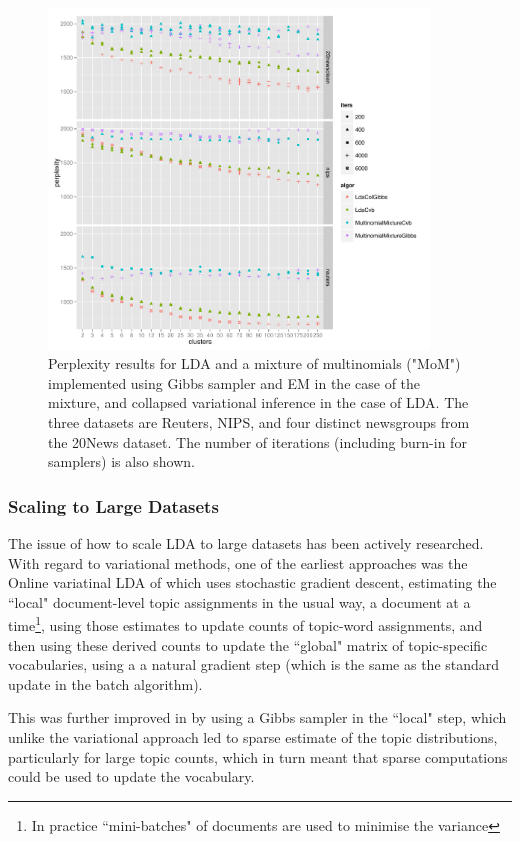 \begin{figure}
  \centering
    \includegraphics[width=0.9\textwidth]{plots/results-2013-03-18.pdf}
  \caption{Perplexity results for LDA and a mixture of multinomials ("MoM") implemented using Gibbs sampler and EM in the case of the mixture, and collapsed variational inference in the case of LDA. The three datasets are Reuters, NIPS, and four distinct newsgroups from the 20News dataset. The number of iterations (including burn-in for samplers) is also shown.}
  \label{fig:nip-reuters-20news-tests}
\end{figure}

\subsubsection*{Scaling to Large Datasets}
The issue of how to scale LDA to large datasets has been actively researched. With regard to variational methods, one of the earliest approaches was the Online variatinal LDA of \cite{Hoffman2010} which uses stochastic gradient descent\cite{Bottou2004}\cite{Bottou2008}, estimating the ``local" document-level topic assignments in the usual way, a document at a time\footnote{In practice ``mini-batches" of documents are used to minimise the variance}, using those estimates to update counts of topic-word assignments, and then using these derived counts to update the ``global" matrix of topic-specific vocabularies, using a a natural gradient step (which is the same as the standard update in the batch algorithm).

This was further improved in \cite{Mimno2012a} by using a Gibbs sampler in the ``local" step, which unlike the variational approach led to sparse estimate of the topic distributions, particularly for large topic counts, which in turn meant that sparse computations could be used to update the vocabulary.

